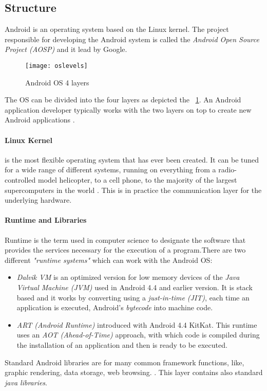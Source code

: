 \subsection{Structure}
\par
Android is an operating system based on the Linux kernel. The project responsible for developing the Android system is called the \textit{Android Open Source Project (AOSP)} and it lead by Google.
\begin{figure}[h]
	\centering
	\texttt{[image: oslevels]}
	\caption{Android OS 4 layers}
	\label{fig:2.3}
\end{figure}

The OS can be divided into the four layers as depicted the \figurename~\ref{fig:2.3}. An Android application developer typically works with the two layers on top to create new Android applications \cite{vogel2016android}.

\paragraph{Linux Kernel} is the most flexible operating system that has ever been created. It can be tuned for a wide range of different systems, running on everything from a radio-controlled model helicopter, to a cell phone, to the majority of the largest supercomputers in the world \cite{hartman2006linux}. This is in practice the communication layer for the underlying hardware.
\paragraph{Runtime and Libraries} \par Runtime is the term used in computer science to designate the software that provides the services necessary for the execution of a program.There are two different \textit{"runtime systems"} which can work with the Android OS:
\begin{itemize}
	\item \textit{Dalvik VM} is an optimized version for low memory devices of the \textit{Java Virtual Machine (JVM)} used in Android 4.4 and earlier version. It is stack based and it works by converting using a \textit{just-in-time (JIT)}, each time an application is executed, Android's \textit{bytecode} into machine code.
	\item \textit{ART (Android Runtime)} introduced with Android 4.4 KitKat. This runtime uses an \textit{AOT (Ahead-of-Time)} approach, with which code is compiled during the installation of an application and then is ready to be executed.
\end{itemize}
\par Standard Android libraries are for many common framework functions, like, graphic rendering, data storage, web browsing. \cite{vogel2016android}. This layer contains also standard \textit{java libraries}.
